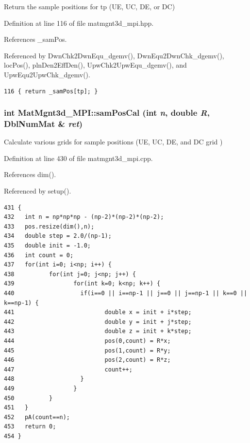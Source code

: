Return the sample positions for tp (UE, UC, DE, or DC) 

Definition at line 116 of file matmgnt3d\_\-mpi.hpp.

References \_\-sam\-Pos.

Referenced by Dwn\-Chk2Dwn\-Equ\_\-dgemv(), Dwn\-Equ2Dwn\-Chk\_\-dgemv(), loc\-Pos(), pln\-Den2Eff\-Den(), Upw\-Chk2Upw\-Equ\_\-dgemv(), and Upw\-Equ2Upw\-Chk\_\-dgemv().

\footnotesize\begin{verbatim}116 { return _samPos[tp]; }
\end{verbatim}\normalsize 


\subsubsection{\setlength{\rightskip}{0pt plus 5cm}int Mat\-Mgnt3d\_\-MPI::sam\-Pos\-Cal (int {\em n}, double {\em R}, Dbl\-Num\-Mat \& {\em ret})}\label{classMatMgnt3d__MPI_632bf1ef6adf396e012a69cc9d71a202_632bf1ef6adf396e012a69cc9d71a202}


Calculate various grids for sample positions (UE, UC, DE, and DC grid ) 

Definition at line 430 of file matmgnt3d\_\-mpi.cpp.

References dim().

Referenced by setup().

\footnotesize\begin{verbatim}431 {
432   int n = np*np*np - (np-2)*(np-2)*(np-2);
433   pos.resize(dim(),n);
434   double step = 2.0/(np-1);
435   double init = -1.0;
436   int count = 0;
437   for(int i=0; i<np; i++) {
438          for(int j=0; j<np; j++) {
439                 for(int k=0; k<np; k++) {
440                   if(i==0 || i==np-1 || j==0 || j==np-1 || k==0 || k==np-1) {
441                          double x = init + i*step;
442                          double y = init + j*step;
443                          double z = init + k*step;
444                          pos(0,count) = R*x;
445                          pos(1,count) = R*y;
446                          pos(2,count) = R*z;
447                          count++;
448                   }
449                 }       
450          }      
451   }
452   pA(count==n);
453   return 0;
454 }
\end{verbatim}\normalsize 


